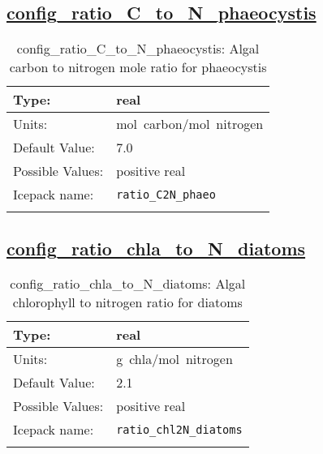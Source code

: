 \subsection[config\_ratio\_C\_to\_N\_phaeocystis]{\hyperref[sec:nm_tab_biogeochemistry]{config\_ratio\_C\_to\_N\_phaeocystis}}
\label{subsec:nm_sec_config_ratio_C_to_N_phaeocystis}
\begin{center}
\begin{longtable}{| p{2.0in} || p{4.0in} |}
    \hline
    Type: & real \\
    \hline
    Units: & \si{mol.carbon/mol.nitrogen} \\
    \hline
    Default Value: & 7.0 \\
    \hline
    Possible Values: & positive real \\
    \hline
    \hline
    Icepack name: & \verb+ratio_C2N_phaeo+ \\
    \caption{config\_ratio\_C\_to\_N\_phaeocystis: Algal carbon to nitrogen mole ratio for phaeocystis}
\end{longtable}
\end{center}
\subsection[config\_ratio\_chla\_to\_N\_diatoms]{\hyperref[sec:nm_tab_biogeochemistry]{config\_ratio\_chla\_to\_N\_diatoms}}
\label{subsec:nm_sec_config_ratio_chla_to_N_diatoms}
\begin{center}
\begin{longtable}{| p{2.0in} || p{4.0in} |}
    \hline
    Type: & real \\
    \hline
    Units: & \si{g.chla/mol.nitrogen} \\
    \hline
    Default Value: & 2.1 \\
    \hline
    Possible Values: & positive real \\
    \hline
    \hline
    Icepack name: & \verb+ratio_chl2N_diatoms+ \\
    \caption{config\_ratio\_chla\_to\_N\_diatoms: Algal chlorophyll to nitrogen ratio for diatoms}
\end{longtable}
\end{center}
